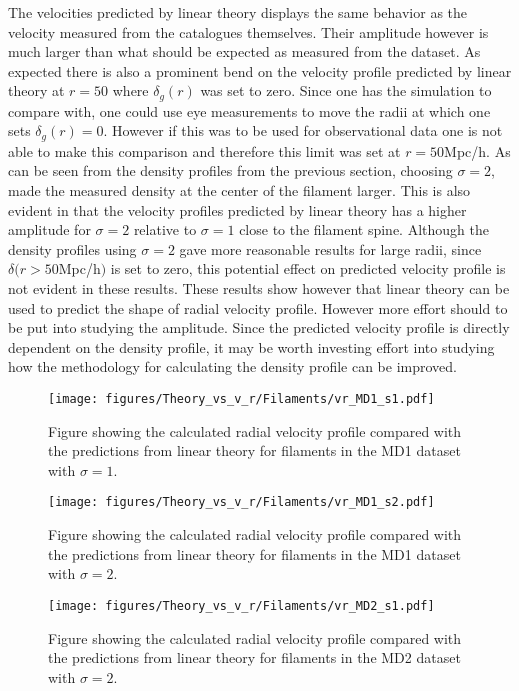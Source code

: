 The velocities predicted by linear theory displays the same behavior as the velocity measured from the catalogues themselves. Their amplitude however is much larger than what should be expected as measured from the dataset. As expected there is also a prominent bend on the velocity profile predicted by linear theory at $r=50$ where $\delta_g(r)$ was set to zero. Since one has the simulation to compare with, one could use eye measurements to move the radii at which one sets $\delta_g(r)=0$. However if this was to be used for observational data one is not able to make this comparison and therefore this limit was set at $r=50$Mpc/h. As can be seen from the density profiles from the previous section, choosing $\sigma=2$, made the measured density at the center of the filament larger. This is also evident in that the velocity profiles predicted by linear theory has a higher amplitude for $\sigma=2$ relative to $\sigma=1$ close to the filament spine. Although the density profiles using $\sigma=2$ gave more reasonable results for large radii, since $\delta(r>50$Mpc/h$)$ is set to zero, this potential effect on predicted velocity profile is not evident in these results. These results show however that linear theory can be used to predict the shape of radial velocity profile. However more effort should to be put into studying the amplitude. Since the predicted velocity profile is directly dependent on the density profile, it may be worth investing effort into studying how the methodology for calculating the density profile can be improved. 


\begin{figure}[H]
    \texttt{[image: figures/Theory\_vs\_v\_r/Filaments/vr\_MD1\_s1.pdf]}
    \caption{Figure showing the calculated radial velocity profile compared with the predictions from linear theory for filaments in the MD1 dataset with $\sigma=1$.}
    \label{fig:filvrMD1s1}
\end{figure}

\begin{figure}[H]
    \texttt{[image: figures/Theory\_vs\_v\_r/Filaments/vr\_MD1\_s2.pdf]}
    \caption{Figure showing the calculated radial velocity profile compared with the predictions from linear theory for filaments in the MD1 dataset with $\sigma=2$.}
    \label{fig:filvrMD1s2}
\end{figure}

\begin{figure}[H]
    \texttt{[image: figures/Theory\_vs\_v\_r/Filaments/vr\_MD2\_s1.pdf]}
    \caption{Figure showing the calculated radial velocity profile compared with the predictions from linear theory for filaments in the MD2 dataset with $\sigma=2$.}
    \label{fig:filvrMD2s1}
\end{figure}

